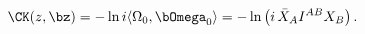 \begin{equation}
\CK(z,\bz) = - \ln i \langle \Omega_0, \bOmega_0 \rangle = - \ln
\left( i \, \bar{X}_A I^{AB} X_B \right).
\end{equation}

